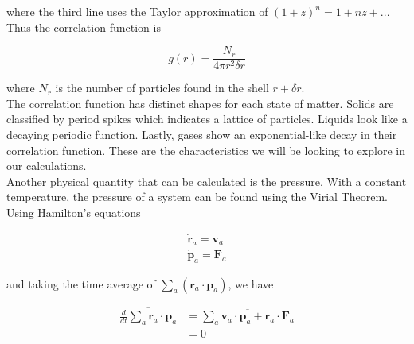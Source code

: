 \documentclass{article}
\begin{document}
\begin{multicols}{2}
\noindent where the third line uses the Taylor approximation of $(1+z)^n = 1 + nz+ ...$  Thus the correlation function is

\begin{equation}
g(r) = \frac{N_r}{4 \pi r^2 \delta r}
\end{equation}

\noindent where $N_r$ is the number of particles found in the shell $r + \delta r$.  \\

The correlation function has distinct shapes for each state of matter.  Solids are classified by period spikes which indicates a lattice of particles.  Liquids look like a decaying periodic function.  Lastly, gases show an exponential-like decay in their correlation function.  These are the characteristics we will be looking to explore in our calculations. \\



Another physical quantity that can be calculated is the pressure.  With a constant temperature, the pressure of a system can be found using the Virial Theorem.  Using Hamilton's equations

\begin{equation}
\begin{split}
\dot{\textbf{r}}_a = \textbf{v}_a \\
\dot{\textbf{p}}_a = \textbf{F}_a 
\end{split}
\end{equation}

\noindent and taking the time average of $\sum \limits _a (\textbf{r}_a \cdot \textbf{p}_a)$, we have

\begin{equation}
\begin{split}
\overline{\frac{d}{dt} \sum \limits _a \textbf{r}_a \cdot \textbf{p}_a} & = \overline{\sum \limits _a \textbf{v}_a \cdot \textbf{p}_a + \textbf{r}_a \cdot \textbf{F}_a} \\
& = 0
\end{split}
\end{equation}


\end{multicols}
\end{document}
